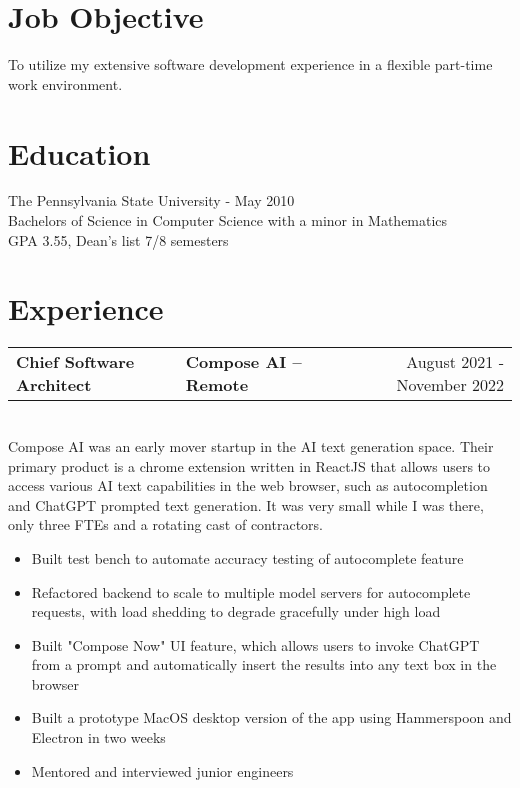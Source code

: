 \documentclass{res}
\newlength{\vsep}
\begin{document}
 


\vspace{-24pt}
\address{bennet.huber@gmail.com\\(215) 490-4297}
\address{1219 NW Richmond Beach Rd\\Shoreline, WA 98177}

\begin{resume}

\section{Job Objective}
    To utilize my extensive software development experience in a flexible part-time work environment.
 
\section{Education}
    The Pennsylvania State University - May 2010\\
    Bachelors of Science in Computer Science with a minor in Mathematics\\
    GPA 3.55, Dean's list 7/8 semesters

\section{Experience}
   \begin{tabularx}{\textwidth}{@{}>{\bf}l>{\large\bf\centering\arraybackslash}Xr@{}}
   Chief Software Architect & Compose AI -- Remote & August 2021 - November 2022\vspace{\vsep}\\
   \end{tabularx}\\
   Compose AI was an early mover startup in the AI text generation space.  Their primary product is a chrome extension written in ReactJS that allows users to access various AI text capabilities in the web browser, such as autocompletion and ChatGPT prompted text generation.  It was very small while I was there, only three FTEs and a rotating cast of contractors.
   \begin{itemize}
   \item Built test bench to automate accuracy testing of autocomplete feature
   \item Refactored backend to scale to multiple model servers for autocomplete requests, with load shedding to degrade gracefully under high load
   \item Built "Compose Now" UI feature, which allows users to invoke ChatGPT from a prompt and automatically insert the results into any text box in the browser
   \item Built a prototype MacOS desktop version of the app using Hammerspoon and Electron in two weeks
   \item Mentored and interviewed junior engineers
   \end{itemize}
   \vspace{\vsep}


\end{resume}
\end{document}
